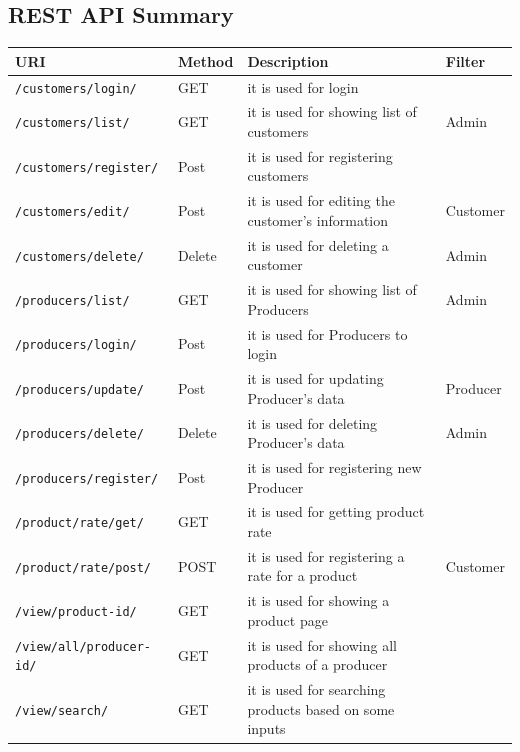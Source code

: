 \subsection{REST API Summary}


\begin{longtable}{|p{}|p{} |p{}|p{}|} 
\hline
\textbf{URI} & \textbf{Method} & \textbf{Description} & \textbf{Filter} \\\hline
\texttt{/customers/login/} & GET &  it is used for login & \\\hline
\texttt{/customers/list/} & GET &  it is used for showing list of customers & Admin\\\hline
\texttt{/customers/register/} & Post &  it is used for registering customers &\\\hline
\texttt{/customers/edit/} & Post &  it is used for editing the customer's information & Customer\\\hline
\texttt{/customers/delete/} & Delete &  it is used for deleting a customer & Admin\\\hline
\texttt{/producers/list/} & GET &  it is used for showing list of Producers & Admin\\\hline
\texttt{/producers/login/} & Post &  it is used for  Producers to login & \\\hline
\texttt{/producers/update/} & Post &  it is used for updating  Producer's data & Producer\\\hline
\texttt{/producers/delete/} & Delete &  it is used for deleting  Producer's data & Admin\\\hline
\texttt{/producers/register/} & Post &  it is used for registering new  Producer & \\\hline
\texttt{/product/rate/get/} & GET &  it is used for getting product rate & \\\hline
\texttt{/product/rate/post/} & POST &  it is used for registering a rate for a product & Customer\\\hline
\texttt{/view/product-id/} & GET &  it is used for showing a product page & \\\hline
\texttt{/view/all/producer-id/} & GET &  it is used for showing all products of a producer & \\\hline
\texttt{/view/search/} & GET &  it is used for searching products based on some inputs & \\\hline

\end{longtable}
